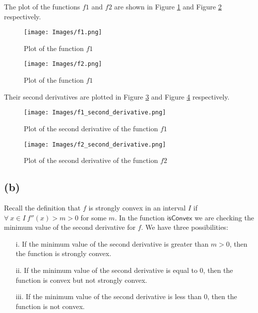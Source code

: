 \documentclass{article}
\begin{document}
The plot of the functions $f1$ and $f2$ are shown in Figure \ref{fig:f1} and Figure \ref{fig:f2} respectively.

\begin{figure}
    \centering
    \texttt{[image: Images/f1.png]}
    \caption{Plot of the function $f1$}
    \label{fig:f1}
\end{figure}

\begin{figure}
    \centering
    \texttt{[image: Images/f2.png]}
    \caption{Plot of the function $f1$}
    \label{fig:f2}
\end{figure}

Their second derivatives are plotted in Figure \ref{fig:f1_second_derivative} and Figure \ref{fig:f2_second_derivative} respectively.

\begin{figure}
    \centering
    \texttt{[image: Images/f1\_second\_derivative.png]}
    \caption{Plot of the second derivative of the function $f1$}
    \label{fig:f1_second_derivative}
\end{figure}

\begin{figure}
    \centering
    \texttt{[image: Images/f2\_second\_derivative.png]}
    \caption{Plot of the second derivative of the function $f2$}
    \label{fig:f2_second_derivative}
\end{figure}

\subsection*{(b)}

Recall the definition that $f$ is strongly convex in an interval $I$ if $\forall\ x \in I\ f''(x) > m > 0$ for some $m$. In the function $\mathsf{isConvex}$ we are checking the minimum value of the second derivative for $f$. We have three possibilities:
\begin{itemize}
    \item[i.] If the minimum value of the second derivative is greater than $m > 0$, then the function is strongly convex.
    \item[ii.] If the minimum value of the second derivative is equal to 0, then the function is convex but not strongly convex.
    \item[iii.] If the minimum value of the second derivative is less than 0, then the function is not convex.
\end{itemize}
\end{document}
